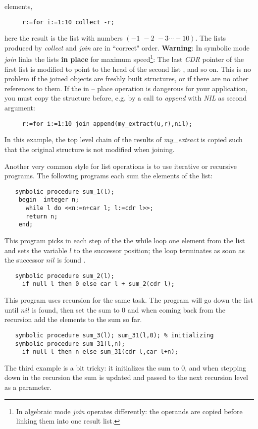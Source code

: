 \documentclass[11pt]{article}
\begin{document}
elements,
\begin{verbatim}
     r:=for i:=1:10 collect -r;
\end{verbatim}
here the result is the list with numbers $(-1\,\, -2\,\, -3 \cdots -10)$.
The lists produced by {\em collect} and {\em join} are in ``correct" 
order.
{\bf Warning}: In symbolic mode  {\em join} links the lists 
{\bf in place} for maximum speed\footnote{In algebraic mode {\em join} operates differently: the operands
are copied before linking them into one result list.}:
The last {\em CDR} pointer  of the first list is modified to 
point to the head of the second list , and so on.
This is no problem if the joined objects are freshly built
structures, or if there are no other references to them.
If the in -- place operation is dangerous for your application,
you must copy the structure before, e.g. by a call to {\em append}
with {\em NIL} as second argument:
\begin{verbatim}
     r:=for i:=1:10 join append(my_extract(u,r),nil);
\end{verbatim}
In this example, the top level chain of the results of {\em my\_extract}
is copied such that the original structure is not modified when
joining.


Another very common style for list operations is to use 
iterative or recursive programs. The following programs each
sum the elements of the list:
\begin{verbatim}
   symbolic procedure sum_1(l);
    begin  integer n;
      while l do <<n:=n+car l; l:=cdr l>>;
      return n;
    end;
\end{verbatim}
This program picks in each step of the the while loop one
element from the list and sets the variable $l$ to
the successor position; the loop terminates as soon as the 
successor $nil$ is found .
\begin{verbatim}
   symbolic procedure sum_2(l);
     if null l then 0 else car l + sum_2(cdr l);
\end{verbatim}
This program uses recursion for the same task.
The program will go down the list until $nil$ is found,
then set the sum to $0$ and when coming back from the
recursion add the elements to the sum so far.
\begin{verbatim}
   symbolic procedure sum_3(l); sum_31(l,0); % initializing
   symbolic procedure sum_31(l,n);
     if null l then n else sum_31(cdr l,car l+n);
\end{verbatim}
The third example is a bit tricky: it initializes
the sum to 0, and when stepping down in the
recursion the sum is updated and passed to the next
recursion level as a parameter.
\end{document}
